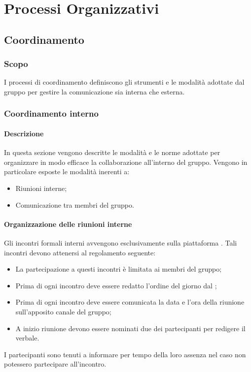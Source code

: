 \section{Processi Organizzativi}
\subsection{Coordinamento}
\subsubsection{Scopo}
I processi di coordinamento definiscono gli strumenti e le modalità adottate dal gruppo per gestire la comunicazione sia interna che esterna.
\subsubsection{Coordinamento interno}
\paragraph{Descrizione}
In questa sezione vengono descritte le modalità e le norme adottate per organizzare in modo efficace la collaborazione all'interno del gruppo. 
Vengono in particolare esposte le modalità inerenti a:
\begin{itemize}
\item Riunioni interne;
\item Comunicazione tra membri del gruppo.
\end{itemize}
\paragraph{Organizzazione delle riunioni interne}
Gli incontri formali interni avvengono esclusivamente sulla piattaforma .
Tali incontri devono attenersi al regolamento seguente:
\begin{itemize}
\item La partecipazione a questi incontri è limitata ai membri del gruppo;
\item Prima di ogni incontro deve essere redatto l'ordine del giorno dal \RdP{};
\item Prima di ogni incontro deve essere comunicata la data e l'ora della riunione sull'apposito canale  del gruppo;
\item A inizio riunione devono essere nominati due dei partecipanti per redigere il verbale.
\end{itemize}
I partecipanti sono tenuti a informare per tempo della loro assenza nel caso non potessero partecipare all'incontro.
